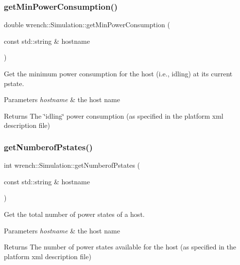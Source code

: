 \subsubsection{\texorpdfstring{get\+Min\+Power\+Consumption()}{getMinPowerConsumption()}}
{\footnotesize\ttfamily double wrench\+::\+Simulation\+::get\+Min\+Power\+Consumption (\begin{DoxyParamCaption}\item[{const std\+::string \&}]{hostname }\end{DoxyParamCaption})\hspace{0.3cm}{\ttfamily [static]}}



Get the minimum power consumption for the host (i.\+e., idling) at its current pstate. 


\begin{DoxyParams}{Parameters}
{\em hostname} & the host name \\
\hline
\end{DoxyParams}
\begin{DoxyReturn}{Returns}
The \char`\"{}idling\char`\"{} power consumption (as specified in the platform xml description file) 
\end{DoxyReturn}
\mbox{\label{classwrench_1_1_simulation_a5e8d5b963d2278c79b49a0ed7db2b933}} 
\subsubsection{\texorpdfstring{get\+Numberof\+Pstates()}{getNumberofPstates()}}
{\footnotesize\ttfamily int wrench\+::\+Simulation\+::get\+Numberof\+Pstates (\begin{DoxyParamCaption}\item[{const std\+::string \&}]{hostname }\end{DoxyParamCaption})\hspace{0.3cm}{\ttfamily [static]}}



Get the total number of power states of a host. 


\begin{DoxyParams}{Parameters}
{\em hostname} & the host name \\
\hline
\end{DoxyParams}
\begin{DoxyReturn}{Returns}
The number of power states available for the host (as specified in the platform xml description file) 
\end{DoxyReturn}
\mbox{\label{classwrench_1_1_simulation_aff0338aa6831c6ac252cf0673fe68f44}} 
